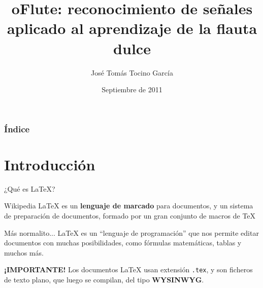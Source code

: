 \documentclass[9pt,xcolor=svgnames]{beamer}
\title{oFlute: reconocimiento de señales aplicado al aprendizaje de la flauta
  dulce}
\author[José Tomás Tocino García]{José Tomás Tocino García}
\date[Sept 2011]{Septiembre de 2011}
\begin{document}


\begin{frame}
  \titlepage
\end{frame}

\normalsize

\begin{frame}
 \frametitle{Índice} 
 \transboxin
 \tableofcontents
\end{frame}
  
  
 \section{Introducción}

 \begin{frame}{¿Qué es \LaTeX?}
   \begin{block}{Wikipedia}
     \noindent \LaTeX{} es un \textbf{lenguaje de marcado} para
     documentos, y un sistema de preparación de documentos, formado
     por un gran conjunto de macros de \TeX{}
   \end{block}

   \pause

   \begin{block}{Más normalito...}
     \noindent \LaTeX{} es un ``lenguaje de programación'' que nos
     permite editar documentos con muchas posibilidades, como fórmulas
     matemáticas, tablas y muchos más.
   \end{block}

   \pause
   
   \begin{block}{\textbf{¡IMPORTANTE!}}
     \noindent Los documentos \LaTeX{} usan extensión \texttt{.tex}, y
     son ficheros de texto plano, que luego se compilan, del tipo
     \textbf{WYSINWYG}.
   \end{block}
   
 \end{frame}

 
\end{document}
